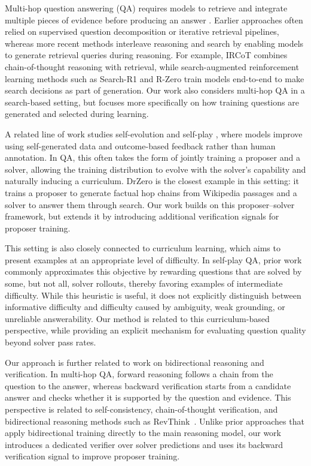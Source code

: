 \documentclass{article}
\begin{document}
Multi-hop question answering (QA) requires models to retrieve and integrate multiple pieces of evidence before producing an answer \cite{MuSiQue}. Earlier approaches often relied on supervised question decomposition or iterative retrieval pipelines, whereas more recent methods interleave reasoning and search by enabling models to generate retrieval queries during reasoning. For example, IRCoT \cite{trivedi2023interleaving} combines chain-of-thought reasoning with retrieval, while search-augmented reinforcement learning methods \cite{li2025search, jiang2025s3} such as Search-R1 \cite{SearchR1} and R-Zero \cite{huang2026rzero} train models end-to-end to make search decisions as part of generation. Our work also considers multi-hop QA in a search-based setting, but focuses more specifically on how training questions are generated and selected during learning.

A related line of work studies self-evolution and self-play \cite{chen2024self}, where models improve using self-generated data and outcome-based feedback rather than human annotation. In QA, this often takes the form of jointly training a proposer and a solver, allowing the training distribution to evolve with the solver's capability and naturally inducing a curriculum. DrZero is the closest example in this setting: it trains a proposer to generate factual hop chains from Wikipedia passages and a solver to answer them through search. Our work builds on this proposer--solver framework, but extends it by introducing additional verification signals for proposer training.

This setting is also closely connected to curriculum learning, which aims to present examples at an appropriate level of difficulty. In self-play QA, prior work \cite{wang2025socratic, huang2026rzero} commonly approximates this objective by rewarding questions that are solved by some, but not all, solver rollouts, thereby favoring examples of intermediate difficulty. While this heuristic is useful, it does not explicitly distinguish between informative difficulty and difficulty caused by ambiguity, weak grounding, or unreliable answerability. Our method is related to this curriculum-based perspective, while providing an explicit mechanism for evaluating question quality beyond solver pass rates.

Our approach is further related to work on bidirectional reasoning and verification. In multi-hop QA, forward reasoning follows a chain from the question to the answer, whereas backward verification starts from a candidate answer and checks whether it is supported by the question and evidence. This perspective is related to self-consistency, chain-of-thought verification, and bidirectional reasoning methods such as RevThink~\cite{chen-etal-2025-reverse}. Unlike prior approaches that apply bidirectional training directly to the main reasoning model, our work introduces a dedicated verifier over solver predictions and uses its backward verification signal to improve proposer training.
\end{document}
